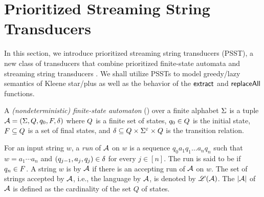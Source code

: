 
\section{Prioritized Streaming String Transducers}  \label{sect:psst}

In this section, we introduce prioritized streaming string transducers (PSST), 
a new class of transducers that combine prioritized finite-state automata \cite{BM17} 
and streaming string transducers \cite{AC10,AD11}.
We shall utilize PSSTs to model greedy/lazy semantics of Kleene star/plus as well as the behavior of the $\mathsf{extract}$ and $\mathsf{replaceAll}$ functions.



\begin{definition} \label{def:nfa}
	A \emph{(nondeterministic) finite-state automaton}
	(\FA{}) over a finite alphabet $\Sigma$ is a tuple $\mathcal{A} =
	(\Sigma, Q, q_0, F, \delta)$ where 
	$Q$ is a finite set of 
	states, $q_0\in Q$ is
	the initial state, $F\subseteq Q$ is a set of final states, and 
	$\delta\subseteq Q \times 
	\Sigma^\varepsilon \times  Q$ is the
	transition relation. 
\end{definition}

For an input string $w$, a \emph{run} of $\mathcal{A}$ on $w$
is a sequence $q_0 a_1 q_1 \ldots a_n q_n$ such that $w = a_1 \cdots a_n$ and $(q_{j-1}, a_{j}, q_{j}) \in
\delta$ for every $j \in [n]$.
The run is said to be  if $q_n \in F$.
A string $w$ is  by $\mathcal{A}$ if there is an accepting run of
$\mathcal{A}$ on $w$. 
The set of strings accepted by $\mathcal{A}$, i.e., the language  by $\mathcal{A}$, is denoted by $\mathscr{L}(\mathcal{A})$.
The  $|\mathcal{A}|$ of $\mathcal{A}$ is defined as the cardinality of the set $Q$ of states.

